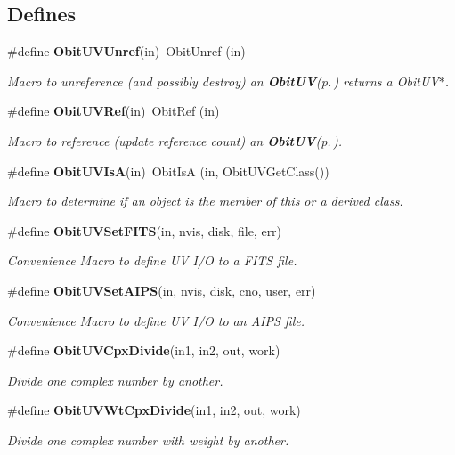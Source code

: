 \subsection*{Defines}
\begin{CompactItemize}
\item 
\#define {\bf Obit\-UVUnref}(in)\ Obit\-Unref (in)
\begin{CompactList}\small\item\em Macro to unreference (and possibly destroy) an {\bf Obit\-UV}{\rm (p.\,\pageref{structObitUV})} returns a Obit\-UV$\ast$. \item\end{CompactList}\item 
\#define {\bf Obit\-UVRef}(in)\ Obit\-Ref (in)
\begin{CompactList}\small\item\em Macro to reference (update reference count) an {\bf Obit\-UV}{\rm (p.\,\pageref{structObitUV})}. \item\end{CompactList}\item 
\#define {\bf Obit\-UVIs\-A}(in)\ Obit\-Is\-A (in, Obit\-UVGet\-Class())
\begin{CompactList}\small\item\em Macro to determine if an object is the member of this or a derived class. \item\end{CompactList}\item 
\#define {\bf Obit\-UVSet\-FITS}(in, nvis, disk, file, err)
\begin{CompactList}\small\item\em Convenience Macro to define UV I/O to a FITS file. \item\end{CompactList}\item 
\#define {\bf Obit\-UVSet\-AIPS}(in, nvis, disk, cno, user, err)
\begin{CompactList}\small\item\em Convenience Macro to define UV I/O to an AIPS file. \item\end{CompactList}\item 
\#define {\bf Obit\-UVCpx\-Divide}(in1, in2, out, work)
\begin{CompactList}\small\item\em Divide one complex number by another. \item\end{CompactList}\item 
\#define {\bf Obit\-UVWt\-Cpx\-Divide}(in1, in2, out, work)
\begin{CompactList}\small\item\em Divide one complex number with weight by another. \item\end{CompactList}\end{CompactItemize}
